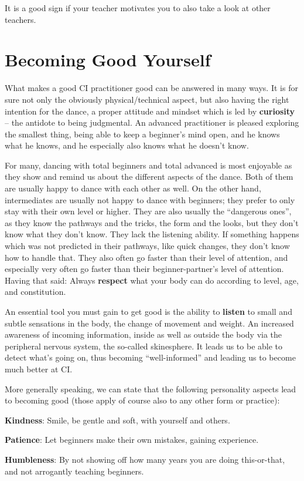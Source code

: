 It is a good sign if your teacher motivates you to also take a look at other teachers.

\section{Becoming Good Yourself}\label{sec:becoming-good-yourself}

What makes a good CI practitioner good can be answered in many ways.
It is for sure not only the obviously physical/technical aspect, but also having the right intention for the dance, a proper attitude and mindset which is led by \textbf{curiosity} -- the antidote to being judgmental.
An advanced practitioner is pleased exploring the smallest thing, being able to keep a beginner's mind open, and he knows what he knows, and he especially also knows what he doesn't know.

For many, dancing with total beginners and total advanced is most enjoyable as they show and remind us about the different aspects of the dance.
Both of them are usually happy to dance with each other as well.
On the other hand, intermediates are usually not happy to dance with beginners; they prefer to only stay with their own level or higher.
They are also usually the ``dangerous ones'', as they know the pathways and the tricks, the form and the looks, but they don't know what they don't know.
They lack the listening ability.
If something happens which was not predicted in their pathways, like quick changes, they don't know how to handle that.
They also often go faster than their level of attention, and especially very often go faster than their beginner-partner's level of attention.
Having that said: Always \textbf{respect} what your body can do according to level, age, and constitution.

An essential tool you must gain to get good is the ability to \textbf{listen} to small and subtle sensations in the body, the change of movement and weight.
An increased awareness of incoming information, inside as well as outside the body via the peripheral nervous system, the so-called \gls{skinesphere}.
It leads us to be able to detect what's going on, thus becoming ``well-informed'' and leading us to become much better at CI.

More generally speaking, we can state that the following personality aspects lead to becoming good (those apply of course also to any other form or practice):

\begin{itemize*}
    \item [] \textbf{Kindness}: Smile, be gentle and soft, with yourself and others.
    \item [] \textbf{Patience}: Let beginners make their own mistakes, gaining experience.
    \item [] \textbf{Humbleness}: By not showing off how many years you are doing this-or-that, and not arrogantly teaching beginners.
\end{itemize*}

